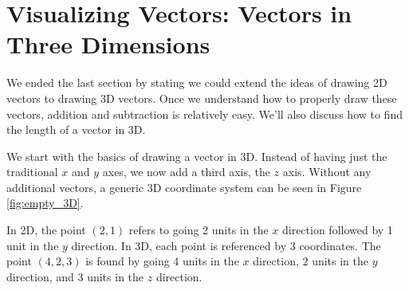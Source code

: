 \clearpage

\section{Visualizing Vectors: Vectors in Three Dimensions}\label{sec:geom_2}


We ended the last section by stating we could extend the ideas of drawing 2D vectors to drawing 3D vectors. Once we understand how to properly draw these vectors, addition and subtraction is relatively easy. We'll also discuss how to find the length of a vector in 3D. 

We start with the basics of drawing a vector in 3D. Instead of having just the traditional $x$ and $y$ axes, we now add a third axis, the $z$ axis. Without any additional vectors, a generic 3D coordinate system can be seen in Figure \ref{fig:empty_3D}.

\begin{myfigure}
\begin{center}
\end{center}
\label{fig:empty_3D}
\end{myfigure}

In 2D, the point $(2,1)$ refers to going 2 units in the $x$ direction followed by 1 unit in the $y$ direction. In 3D, each point is referenced by 3 coordinates. The point $(4,2,3)$ is found by going 4 units in the $x$ direction, $2$ units in the $y$ direction, and 3 units in the $z$ direction. 

